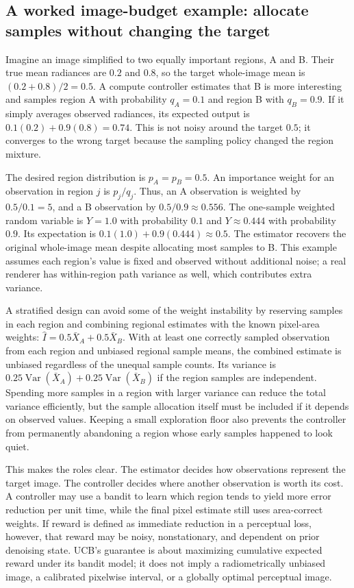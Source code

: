 \subsection{A worked image-budget example: allocate samples without changing the target}\label{03-visual-computing-i-ch012-a-worked-image-budget-example-allocate-samples-without-changing-the-target}

Imagine an image simplified to two equally important regions, A and B. Their true mean radiances are \(0.2\) and \(0.8\), so the target whole-image mean is \((0.2+0.8)/2=0.5\). A compute controller estimates that B is more interesting and samples region A with probability \(q_A=0.1\) and region B with \(q_B=0.9\). If it simply averages observed radiances, its expected output is \(0.1(0.2)+0.9(0.8)=0.74\). This is not noisy around the target \(0.5\); it converges to the wrong target because the sampling policy changed the region mixture.

The desired region distribution is \(p_A=p_B=0.5\). An importance weight for an observation in region \(j\) is \(p_j/q_j\). Thus, an A observation is weighted by \(0.5/0.1=5\), and a B observation by \(0.5/0.9\approx0.556\). The one-sample weighted random variable is \(Y=1.0\) with probability \(0.1\) and \(Y\approx0.444\) with probability \(0.9\). Its expectation is \(0.1(1.0)+0.9(0.444)\approx0.5\). The estimator recovers the original whole-image mean despite allocating most samples to B. This example assumes each region's value is fixed and observed without additional noise; a real renderer has within-region path variance as well, which contributes extra variance.

A stratified design can avoid some of the weight instability by reserving samples in each region and combining regional estimates with the known pixel-area weights: \(\hat I=0.5\bar X_A+0.5\bar X_B\). With at least one correctly sampled observation from each region and unbiased regional sample means, the combined estimate is unbiased regardless of the unequal sample counts. Its variance is \(0.25\operatorname{Var}(\bar X_A)+0.25\operatorname{Var}(\bar X_B)\) if the region samples are independent. Spending more samples in a region with larger variance can reduce the total variance efficiently, but the sample allocation itself must be included if it depends on observed values. Keeping a small exploration floor also prevents the controller from permanently abandoning a region whose early samples happened to look quiet.

This makes the roles clear. The estimator decides how observations represent the target image. The controller decides where another observation is worth its cost. A controller may use a bandit to learn which region tends to yield more error reduction per unit time, while the final pixel estimate still uses area-correct weights. If reward is defined as immediate reduction in a perceptual loss, however, that reward may be noisy, nonstationary, and dependent on prior denoising state. UCB's guarantee is about maximizing cumulative expected reward under its bandit model; it does not imply a radiometrically unbiased image, a calibrated pixelwise interval, or a globally optimal perceptual image.

